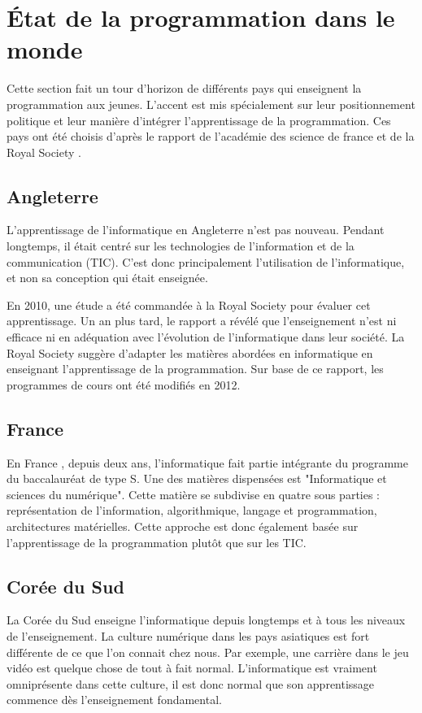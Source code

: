\section{État de la programmation dans le monde}
\label{monde}
Cette section fait un tour d'horizon de différents pays qui enseignent la programmation aux jeunes. L'accent est mis spécialement sur leur positionnement politique et leur manière d'intégrer l'apprentissage de la programmation. Ces pays ont été choisis d'après le rapport de l'académie des science de france \cite{ens-info-fr} et de la Royal Society \cite{comput-school}.
﻿
\subsection{Angleterre}
L'apprentissage de l'informatique en Angleterre \cite{status-guid} n'est pas nouveau. Pendant longtemps, il était centré sur les technologies de l'information et de la communication (TIC). C'est donc principalement l'utilisation de l'informatique, et non sa conception qui était enseignée.

En 2010, une étude a été commandée à la Royal Society pour évaluer cet apprentissage. Un an plus tard, le rapport a révélé que l'enseignement n'est ni efficace ni en adéquation avec l'évolution de l'informatique dans leur société. La Royal Society suggère d'adapter les matières abordées en informatique en enseignant l'apprentissage de la programmation. Sur base de ce rapport, les programmes de cours ont été modifiés en 2012.

\subsection{France}
En France \cite{wiki:info-et-sc-du-num} \cite{wiki:bac-sc}, depuis deux ans, l'informatique fait partie intégrante du programme du baccalauréat de type S. Une des matières dispensées est "Informatique et sciences du numérique". Cette matière se subdivise en quatre sous parties : représentation de l'information, algorithmique, langage et programmation, architectures matérielles. Cette approche est donc également basée sur l'apprentissage de la programmation plutôt que sur les TIC.

\subsection{Corée du Sud}
La Corée du Sud enseigne l'informatique depuis longtemps et à tous les niveaux de l'enseignement. La culture numérique dans les pays asiatiques est fort différente de ce que l'on connait chez nous. Par exemple, une carrière dans le jeu vidéo est quelque chose de tout à fait normal. L'informatique est vraiment omniprésente dans cette culture, il est donc normal que son apprentissage commence dès l'enseignement fondamental.

